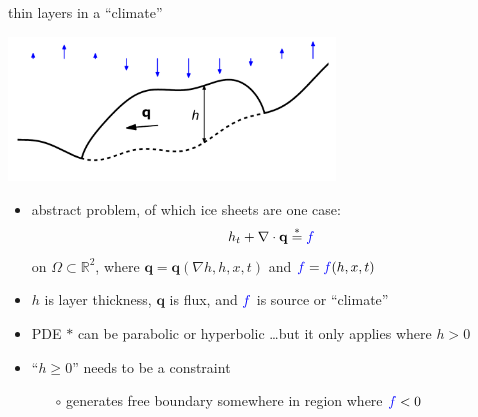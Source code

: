 \documentclass[hide notes,intlimits]{beamer}
\newcommand{\RR}{\mathbb{R}}
\newcommand{\bq}{\mathbf{q}}
\newcommand{\Div}{\nabla\cdot}
\newcommand{\grad}{\nabla}
\begin{document}
\begin{frame}{thin layers in a ``climate''}
\begin{center}
\includegraphics[width=0.65\textwidth,keepaspectratio=true]{cartoon-wclimate}
\end{center}
\vspace{-6mm}
\begin{itemize}
\item abstract problem, of which ice sheets are one case:
  $$h_t + \Div \bq \stackrel{\ast}{=} {\color{blue} f}$$
on $\Omega \subset \RR^2$, where $\bq=\bq(\grad h, h, x, t)$ and ${\color{blue} f}={\color{blue} f}(h,x,t)$
\item $h$ is layer thickness, $\bq$ is flux, and ${\color{blue} f}$ is source or ``climate''
\item PDE $\ast$ can be parabolic or hyperbolic \dots but it only applies where $h>0$
\item ``$h\ge 0$'' needs to be a constraint
  \begin{itemize}
  \item[$\circ$] generates free boundary somewhere in region where ${\color{blue} f} < 0$
  \end{itemize}
\end{itemize}
\end{frame}
\end{document}
